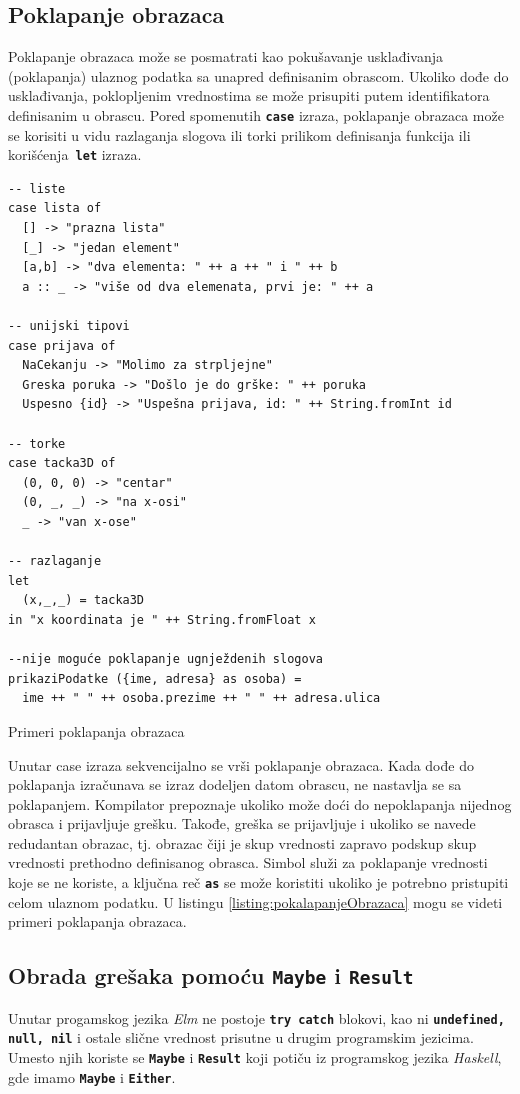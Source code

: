 \documentclass[12pt,oneside]{memoir}
\begin{document}
\subsection{Poklapanje obrazaca}
Poklapanje obrazaca može se posmatrati kao pokušavanje usklađivanja (poklapanja) ulaznog
podatka sa unapred definisanim obrascom. Ukoliko dođe do usklađivanja, poklopljenim
vrednostima se može prisupiti putem identifikatora definisanim u obrascu. Pored spomenutih
\texttt{\textbf{case}} izraza, poklapanje obrazaca može se korisiti u vidu 
razlaganja slogova ili torki prilikom definisanja funkcija ili korišćenja\texttt{\textbf{
let}} izraza.
\begin{listing}[h]
\begin{verbatim}
-- liste 
case lista of
  [] -> "prazna lista"
  [_] -> "jedan element"
  [a,b] -> "dva elementa: " ++ a ++ " i " ++ b
  a :: _ -> "više od dva elemenata, prvi je: " ++ a

-- unijski tipovi
case prijava of
  NaCekanju -> "Molimo za strpljejne"
  Greska poruka -> "Došlo je do grške: " ++ poruka
  Uspesno {id} -> "Uspešna prijava, id: " ++ String.fromInt id

-- torke
case tacka3D of
  (0, 0, 0) -> "centar"
  (0, _, _) -> "na x-osi"
  _ -> "van x-ose"

-- razlaganje
let
  (x,_,_) = tacka3D
in "x koordinata je " ++ String.fromFloat x

--nije moguće poklapanje ugnježdenih slogova
prikaziPodatke ({ime, adresa} as osoba) =
  ime ++ " " ++ osoba.prezime ++ " " ++ adresa.ulica
\end{verbatim}
\caption{Primeri poklapanja obrazaca}
\label{listing:pokalapanjeObrazaca}
\end{listing}

Unutar case izraza sekvencijalno se vrši poklapanje obrazaca. Kada dođe do poklapanja
izračunava se izraz dodeljen datom obrascu, ne nastavlja se sa poklapanjem. Kompilator
prepoznaje ukoliko može doći do nepoklapanja nijednog obrasca i prijavljuje grešku.
Takođe, greška se prijavljuje i ukoliko se navede redudantan obrazac, tj. obrazac čiji je
skup vrednosti zapravo podskup skup vrednosti prethodno definisanog obrasca. 
Simbol \texttt{\textbf{\textunderscore}} služi za poklapanje vrednosti koje se ne koriste,
a ključna reč \texttt{\textbf{as}} se može koristiti ukoliko je potrebno pristupiti celom
ulaznom podatku. U listingu \ref{listing:pokalapanjeObrazaca} mogu se videti primeri
poklapanja obrazaca.

\subsection{Obrada grešaka pomoću \texttt{\textbf{Maybe}} i \texttt{\textbf{Result}}}
Unutar progamskog jezika \emph{Elm} ne postoje \texttt{\textbf{try catch}} blokovi, kao ni \texttt{\textbf{undefined, null, nil}}
i ostale slične vrednost prisutne u drugim programskim jezicima.
Umesto njih koriste se \texttt{\textbf{Maybe}} i \texttt{\textbf{Result}} koji potiču iz programskog jezika \emph{Haskell},
gde imamo \texttt{\textbf{Maybe}} i \texttt{\textbf{Either}}.
\end{document}
